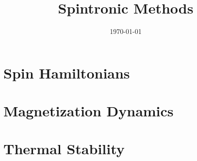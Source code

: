 \documentclass[11pt]{article}
\title{Spintronic Methods}
\author{}
\date{\today}
\numberwithin{equation}{section}
\begin{document}
\maketitle
\tableofcontents





\section{Spin Hamiltonians}



\section{Magnetization Dynamics}


\section{Thermal Stability}







\end{document}

